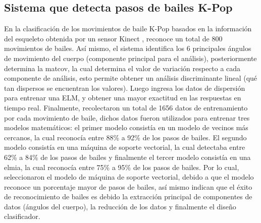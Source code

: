 \subsection{Sistema que detecta pasos de bailes K-Pop} \label{tr:9} 
En la clasificaci\'on de los movimientos de baile K-Pop basados en la informaci\'on del esqueleto obtenida por un sensor Kinect \cite{kim2017classification}, reconoce un total de 800 movimientos de bailes.
\medbreak 
As\'i mismo, el sistema identifica los 6 principales \'angulos de movimiento del cuerpo (componente principal para el an\'alisis), posteriormente determina la \gls{matcov}, la cual determina el valor de variaci\'on respecto a cada componente de an\'alisis,  esto permite obtener un an\'alisis discriminante lineal (qu\'e tan dispersos se encuentran los valores).
\medbreak 
Luego ingresa los datos de dispersi\'on para entrenar una  \acrfull{ELM}, y obtener una mayor exactitud en las respuestas en tiempo real.
\medbreak 
Finalmente,  recolectaron un total de 1656 datos de entrenamiento por cada movimiento de baile, dichos datos fueron utilizados para entrenar tres modelos matem\'aticos: el primer modelo consist\'ia en un modelo de vecinos m\'as cercanos, la cual reconoc\'ia entre 88\% a 92\% de los pasos de bailes. El segundo modelo consist\'ia en una m\'aquina de soporte vectorial, la cual detectaba entre 62\% a 84\% de los pasos de bailes y finalmente el tercer modelo consist\'ia en una \gls{elmia}, la cual reconoc\'ia entre 75\% a 95\% de los pasos de bailes.
\medbreak 
Por lo cual,   seleccionaron el modelo de m\'aquina de soporte vectorial, debido a que el modelo reconoce un porcentaje mayor de pasos de bailes, as\'i mismo indican que el \'exito de reconocimiento de bailes  es debido la extracci\'on principal de componentes de datos (\'angulos del cuerpo), la reducci\'on de los datos y finalmente  el dise\~no clasificador.
